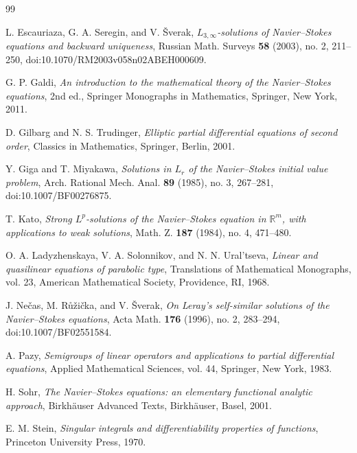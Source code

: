 \documentclass[11pt]{amsart}
\theoremstyle{plain}
\theoremstyle{definition}
\theoremstyle{remark}
\numberwithin{equation}{section}
\begin{document}
\begin{thebibliography}{99}

L. Escauriaza, G. A. Seregin, and V. \v{S}verak,
\emph{\(L_{3,\infty}\)-solutions of Navier--Stokes equations and backward uniqueness},
Russian Math. Surveys \textbf{58} (2003), no. 2, 211--250,
doi:10.1070/RM2003v058n02ABEH000609.

G. P. Galdi,
\emph{An introduction to the mathematical theory of the Navier--Stokes
equations},
2nd ed., Springer Monographs in Mathematics, Springer, New York, 2011.

D. Gilbarg and N. S. Trudinger,
\emph{Elliptic partial differential equations of second order},
Classics in Mathematics, Springer, Berlin, 2001.

Y. Giga and T. Miyakawa,
\emph{Solutions in \(L_r\) of the Navier--Stokes initial value problem},
Arch. Rational Mech. Anal. \textbf{89} (1985), no. 3, 267--281,
doi:10.1007/BF00276875.

T. Kato,
\emph{Strong \(L^p\)-solutions of the Navier--Stokes equation in
\(\mathbb R^m\), with applications to weak solutions},
Math. Z. \textbf{187} (1984), no. 4, 471--480.

O. A. Ladyzhenskaya, V. A. Solonnikov, and N. N. Ural'tseva,
\emph{Linear and quasilinear equations of parabolic type},
Translations of Mathematical Monographs, vol. 23, American Mathematical
Society, Providence, RI, 1968.

J. Ne\v{c}as, M. R\r{u}\v{z}i\v{c}ka, and V. \v{S}verak,
\emph{On Leray's self-similar solutions of the Navier--Stokes equations},
Acta Math. \textbf{176} (1996), no. 2, 283--294,
doi:10.1007/BF02551584.

A. Pazy,
\emph{Semigroups of linear operators and applications to partial differential
equations},
Applied Mathematical Sciences, vol. 44, Springer, New York, 1983.

H. Sohr,
\emph{The Navier--Stokes equations: an elementary functional analytic
approach},
Birkh\"auser Advanced Texts, Birkh\"auser, Basel, 2001.

E. M. Stein,
\emph{Singular integrals and differentiability properties of functions},
Princeton University Press, 1970.

\end{thebibliography}
\end{document}
